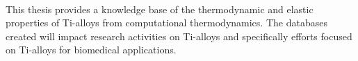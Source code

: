 \paragraph*{} This thesis provides a knowledge base of the thermodynamic and elastic properties of Ti-alloys from computational thermodynamics. The databases created will impact research activities on Ti-alloys and specifically efforts focused on Ti-alloys for biomedical applications.




